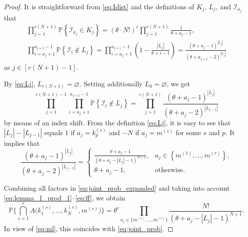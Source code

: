 \documentclass[10pt,a4paper]{amsart}
\newcommand{\Ic}{\mathcal{I}}
\newcommand{\hs}{\hspace{1pt}}
\renewcommand{\P}[1]{\mathbb{P}{\left\{#1\right\}}}
\begin{document}
\begin{proof}
		It is straightforward from \eqref{eq:Idist} and the definitions of $K_j$, $L_j$, and $\Ic_{a_j}$ that
		\begin{gather}
			\label{eq:lemma_1_prod_1}
			\prod_{j=1}^{r(N+1)}\P{\Ic_{a_j} \in K_j}= 
			(\theta \cdot N!)^r \prod_{j=1}^{r(N+1)} \frac{1}{\theta + a_j - 1}, \\
			\prod_{i={a_j + 1}}^{a_{j+1} - 1} \P{\Ic_i \notin L_j}=
			\prod_{i={a_j + 1}}^{a_{j+1}-1} \left(
			1 - \frac{|L_j|}{\theta + i - 1}\right) = 
			\frac{(\theta + a_j - 1)^{\underline{|L_j|}}}{(\theta + a_{j+1} - 2)^{\underline{|L_j|}}}
		\end{gather}
		as $j\in[r(N+1)-1]$.

		By \eqref{eq:Lj}, $L_{r(N+1)} = \varnothing$. Setting additionally $L_0 = \varnothing$, we get
		\begin{equation}
			\prod_{j=1}^{r(N+1)-1} \prod_{i={a_j + 1}}^{a_{j+1} - 1} \P{\Ic_i \notin L_j} = 
			\!\!\prod_{j=1}^{r(N+1)} \frac{(\theta + a_j - 1)^{\underline{|L_j|}}}{(\theta + a_j - 2)^{\underline{|L_{j-1}|}}}
		\end{equation}
		by means of an index shift.        
		From the definition \eqref{eq:Lj}, it is easy to see that $|L_j|-|L_{j-1}|$ equals $1$ if $a_j=k_p^{(s)}$ and $-N$ if $a_j=m^{(s)}$ for some $s$ and $p$.
		It implies that
		\begin{equation}
			\label{eq:ff}
			\frac{(\theta + a_j - 1)^{\underline{|L_j|}}}{(\theta + a_j - 2)^{\underline{|L_{j-1}|}}} = 
			\begin{cases}
				\frac{\theta + a_j - 1}{\left(\theta + a_j - |L_j| - 1\right)^{\underline{N+1}}}, & a_j \in \left\{m^{(1)}, \dots, m^{(r)}\right\}, \\
				\theta + a_j - 1, & \text{otherwise}.
			\end{cases}
		\end{equation}        
		
		Combining all factors in \eqref{eq:joint_prob_expanded} and taking into account \eqref{eq:lemma_1_prod_1}\hs--\hs\eqref{eq:ff}, we obtain
		\begin{equation*}
			\mathbb{P}\biggl\{\bigcap_{s=1}^r A\bigl(k_1^{(s)}, \dots, k_N^{(s)}, m^{(s)}\bigr)\biggr\} = 
			\theta^r \!\!\prod_{a_j\in\{m^{(1)}, \dots, m^{(r)}\}}\frac{N!}{\left(\theta + a_j - |L_j| - 1\right)^{\underline{N+1}}}.
		\end{equation*}
		In view of \eqref{eq:ml}, this coincides with \eqref{eq:joint_prob}.
	\end{proof}
\end{document}
